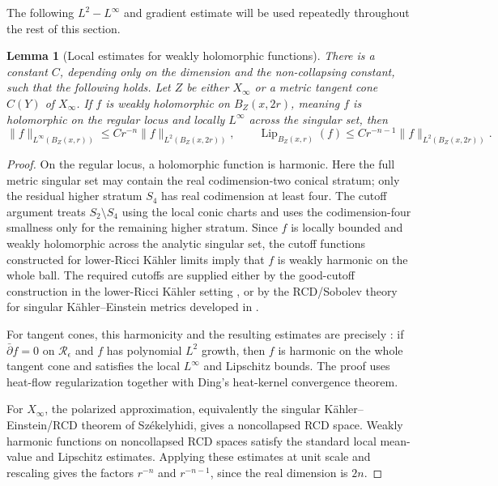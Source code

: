 \documentclass[11pt]{amsart}
\newtheorem{lemma}[theorem]{Lemma}
\theoremstyle{definition}
\theoremstyle{remark}
\begin{document}
The following $L^2-L^\infty$ and gradient estimate will be used repeatedly throughout the rest of this section.  


\begin{lemma}[Local estimates for weakly holomorphic functions]
\label{lem:local-holomorphic-estimates}
There is a constant $C$, depending only on the dimension and the non-collapsing
constant, such that the following holds. Let $Z$ be either $X_\infty$ or a
metric tangent cone $C(Y)$ of $X_\infty$. If $f$ is weakly holomorphic on
$B_Z(x,2r)$, meaning $f$ is holomorphic on the regular locus and locally $L^\infty$
across the singular set, then
\[
        \|f\|_{L^\infty(B_Z(x,r))}
        \leq
        C r^{-n}\|f\|_{L^2(B_Z(x,2r))},
        \qquad
        \operatorname{Lip}_{B_Z(x,r)}(f)
        \leq
        C r^{-n-1}\|f\|_{L^2(B_Z(x,2r))}.
\]
\end{lemma}

\begin{proof}
On the regular locus, a holomorphic function is harmonic. Here the full metric
singular set may contain the real codimension-two conical stratum; only the
residual higher stratum $S_4$ has real codimension at least four. The cutoff
argument treats $S_2\setminus S_4$ using the local conic charts and uses the
codimension-four smallness only for the remaining higher stratum.
Since $f$ is locally
bounded and weakly holomorphic across the analytic singular set, the cutoff
functions constructed for lower-Ricci K\"ahler limits imply that $f$ is weakly
harmonic on the whole ball. The required cutoffs are supplied either by the good-cutoff construction in the
lower-Ricci K\"ahler setting \cite[Section~3]{SLI}, or by the RCD/Sobolev
theory for singular K\"ahler--Einstein metrics developed in
\cite{SzekelyhidiRCD,GuoPhongSongSturmSobolev}.

For tangent cones, this harmonicity and the resulting estimates are precisely
\cite[Proposition~10]{SLII}: if $\bar\partial f=0$ on
$\mathcal R_\epsilon$ and $f$ has polynomial $L^2$ growth, then $f$ is harmonic
on the whole tangent cone and satisfies the local $L^\infty$ and Lipschitz
bounds. The proof uses heat-flow regularization together with Ding's heat-kernel
convergence theorem.

For $X_\infty$, the polarized approximation, equivalently the singular
K\"ahler--Einstein/RCD theorem of Sz\'ekelyhidi, gives a noncollapsed RCD space.
Weakly harmonic functions on noncollapsed RCD spaces satisfy the standard local
mean-value and Lipschitz estimates. Applying these estimates at unit scale and
rescaling gives the factors $r^{-n}$ and $r^{-n-1}$, since the real dimension is
$2n$.
\end{proof}
\end{document}
